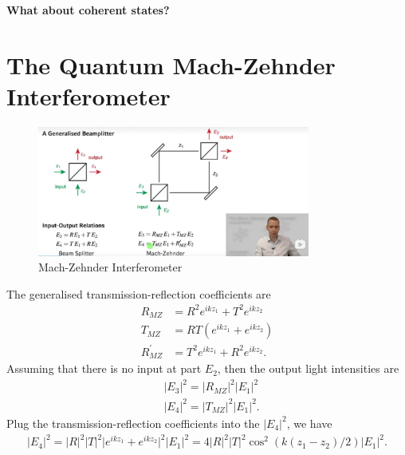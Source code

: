 \documentclass[../../note.tex]{subfiles}
\begin{document}
\textbf{What about coherent states?}
\section{The Quantum Mach-Zehnder Interferometer}
\begin{figure}[!htbp]
	\centering
	\includegraphics[width=0.80\textwidth]{../figures/MZ.jpg}
	\caption{Mach-Zehnder Interferometer}
	\label{fig: mz}
\end{figure}

The generalised transmission-reflection coefficients are 
\begin{align}
    R_{MZ} 
    &= R^2 e^{i k z_1} + T^2 e^{i k z_2} \\
    T_{MZ} 
    &= RT(e^{i k z_1} + e^{i k z_2}) \\
    R^{\prime}_{MZ} 
    &= T^2 e^{i k z_1} + R^2 e^{i k z_2}.
\end{align}
Assuming that there is no input at part $E_2$, then the output light intensities are 
\begin{align}
    &\vert E_3 \vert^2 = \vert R_{MZ} \vert^2 \vert E_1 \vert^2 \\
    &\vert E_4 \vert^2 = \vert T_{MZ} \vert^2 \vert E_1 \vert^2.
\end{align}
Plug the transmission-reflection coefficients into the $\vert E_4 \vert^2$, we have
\begin{align}
    \vert E_4 \vert^2 = \vert R\vert^2 \vert T \vert^2 \vert e^{i k z_1} + e^{i k z_2} \vert^2 \vert E_1 \vert^2 = 4 \vert R\vert^2 \vert T \vert^2 \cos^2(k(z_1 - z_2)/2)\vert E_1 \vert^2.
\end{align}
\end{document}

